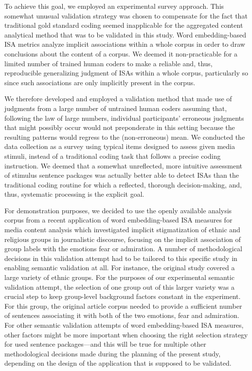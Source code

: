 To achieve this goal, we employed an experimental survey approach. This somewhat unusual validation strategy was chosen to compensate for the fact that traditional gold standard coding seemed inapplicable for the aggregated content analytical method that was to be validated in this study. Word embedding-based ISA metrics analyze implicit associations within a whole corpus in order to draw conclusions about the content of a corpus. We deemed it non-practicable for a limited number of trained human coders to make a reliable and, thus, reproducible generalizing judgment of ISAs within a whole corpus, particularly so since such associations are only implicitly present in the corpus. 

We therefore developed and employed a validation method that made use of judgments from a large number of untrained human coders assuming that, following the law of large numbers, individual participants' erroneous judgments that might possibly occur would not preponderate in this setting because the resulting patterns would regress to the (non-erroneous) mean. We conducted the data collection as a survey using typical items designed to assess given media stimuli, instead of a traditional coding task that follows a precise coding instruction. We deemed that a somewhat unreflected, more intuitive assessment of stimulus sentence packages \parencite[likely to follow a heuristic processing routine within participants;][]{chaiken1989} was actually better able to detect ISAs than the traditional coding routine for which a reflected, thorough decision-making, and, thus, systematic processing is the explicit goal. 

For demonstration purposes, we decided to use the openly available analysis corpus from a recent application of word embedding-based ISA measures for media content analysis \parencite{mueller:2023:DRN} which investigated implicit stigmatization of ethnic and religious groups in journalistic discourse, focusing on the implicit association of group labels with the emotions fear or admiration. A number of methodological decisions in this validation attempt had to be tailored to this specific study in enabling semantic validation at all. For instance, the original study \parencite{mueller:2023:DRN} covered a large variety of ethnic groups. For the purposes of our experimental semantic validation attempt, the selection of one group out of this larger variety was a crucial step to keep group-level background factors constant in the experiment. For this group, the original article corpus needed to provide a sufficient number of sentences associating it with both of the two emotions, fear and admiration. For other semantic validation attempts of word embedding-based ISA measures, other factors might be more important when choosing the right selection strategy for used sentence packages---and this will be true for multiple other methodological decisions made during the planning of the present study, depending on the design of the application that is supposed to be validated.


